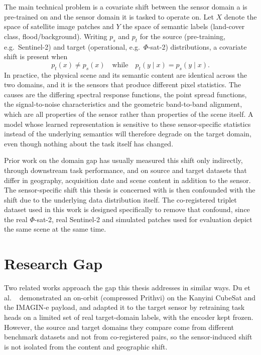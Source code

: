 The main technical problem is a covariate shift between the sensor domain a  is pre-trained on and the sensor domain it is tasked to operate on.
Let $X$ denote the space of satellite image patches and $Y$ the space of semantic labels (land-cover class, flood/background).
Writing $p_s$ and $p_t$ for the source (pre-training, e.g.\ Sentinel-2) and target (operational, e.g.\ $\Phi$-sat-2) distributions, a covariate shift is present when
\begin{equation}
    p_t(x) \neq p_s(x) \quad \text{while} \quad p_t(y \mid x) = p_s(y \mid x).
    \label{eq:covariate-shift}
\end{equation}
In practice, the physical scene and its semantic content are identical across the two domains, and it is the sensors that produce different pixel statistics.
The causes are the differing spectral response functions, the point spread functions, the signal-to-noise characteristics and the geometric band-to-band alignment, which are all properties of the sensor rather than properties of the scene itself.
A model whose learned representation is sensitive to these sensor-specific statistics instead of the underlying semantics will therefore degrade on the target domain, even though nothing about the task itself has changed.

Prior work on the  domain gap has usually measured this shift only indirectly, through downstream task performance, and on source and target datasets that differ in geography, acquisition date and scene content in addition to the sensor.
The sensor-specific shift this thesis is concerned with is then confounded with the shift due to the underlying data distribution itself.
The co-registered triplet dataset used in this work is designed specifically to remove that confound, since the real $\Phi$-sat-2, real Sentinel-2 and simulated patches used for evaluation depict the same scene at the same time.

\section{Research Gap}
\label{sec:research-gap}

Two related works approach the gap this thesis addresses in similar ways.
Du et al.
\ \cite{du2025onorbitdemonstrationgeospatialfoundation} demonstrated an on-orbit  (compressed Prithvi) on the Kanyini CubeSat and the IMAGIN-e payload, and adapted it to the target sensor by retraining task heads on a limited set of real target-domain labels, with the encoder kept frozen.
However, the source and target domains they compare come from different benchmark datasets and not from co-registered pairs, so the sensor-induced shift is not isolated from the content and geographic shift.

